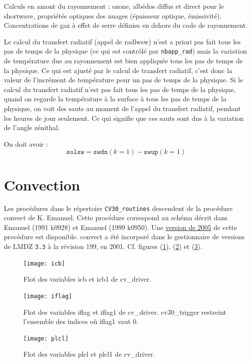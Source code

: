 \documentclass[a4paper,english,french]{article}
\begin{document}
Calculs en amont du rayonnement : ozone, albédos diffus et direct pour
le shortwave, propriétés optiques des nuages (épaisseur optique,
émissivité). Concentrations de gaz à effet de serre définies en dehors
du code de rayonnement.

Le calcul du transfert radiatif (appel de radlwsw) n'est a priori pas
fait tous les pas de temps de la physique (ce qui est contrôlé par
\verb+nbapp_rad+) mais la variation de température due au rayonnement
est bien appliquée tous les pas de temps de la physique. Ce qui est
ajusté par le calcul de transfert radiatif, c'est donc la valeur de
l'incrément de température pour un pas de temps de la physique. Si le
calcul du transfert radiatif n'est pas fait tous les pas de temps de
la physique, quand on regarde la température à la surface à tous les
pas de temps de la physique, on voit des sauts au moment de l'appel du
transfert radiatif, pendant les heures de jour seulement. Ce qui
signifie que ces sauts sont dus à la variation de l'angle zénithal.

On doit avoir :
\begin{equation*}
  \mathtt{solsw} = \mathtt{swdn}(k = 1) - \mathtt{swup}(k = 1)
\end{equation*}

\section{Convection}

Les procédures dans le répertoire \verb+CV30_routines+ descendent de
la procédure convect de K. Emanuel. Cette procédure correspond au
schéma décrit dans Emanuel (1991 k0928) et Emanuel (1999 k0950). Une
\href{http://eaps4.mit.edu/faculty/Emanuel/products}{version de 2005}
de cette procédure est disponible. convect a été incorporé dans le
gestionnaire de versions de LMDZ \verb+3.3+ à la révision 199, en
2001. Cf. figures (\ref{fig:icb}), (\ref{fig:iflag}) et
(\ref{fig:plcl}).
\begin{figure}
  \centering
  \texttt{[image: icb]}
  \caption{Flot des variables icb et icb1 de cv\_driver.}
  \label{fig:icb}
\end{figure}
\begin{figure}
  \centering
  \texttt{[image: iflag]}
  \caption[Flot des variables iflag et iflag1 de cv\_driver]{Flot des
    variables iflag et iflag1 de cv\_driver. cv30\_trigger restreint
    l'ensemble des indices où iflag1 vaut 0.}
  \label{fig:iflag}
\end{figure}
\begin{figure}
  \centering
  \texttt{[image: plcl]}
  \caption{Flot des variables plcl et plcl1 de cv\_driver.}
  \label{fig:plcl}
\end{figure}
\end{document}
